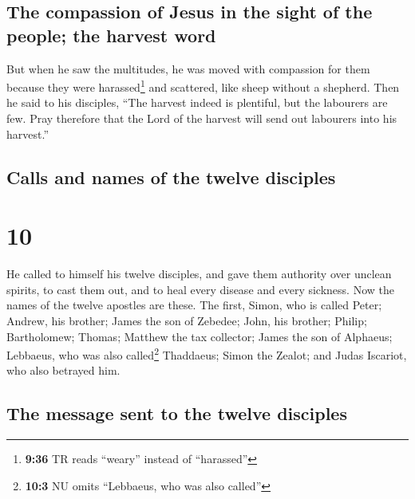 \hypertarget{the-compassion-of-jesus-in-the-sight-of-the-people-the-harvest-word}{%
\subsection{The compassion of Jesus in the sight of the people; the
harvest
word}\label{the-compassion-of-jesus-in-the-sight-of-the-people-the-harvest-word}}

 But when he saw the multitudes, he was moved with
compassion for them because they were harassed\footnote{\textbf{9:36} TR
  reads ``weary'' instead of ``harassed''} and scattered, like sheep
without a shepherd.  Then he said to his disciples, ``The
harvest indeed is plentiful, but the labourers are few. 
Pray therefore that the Lord of the harvest will send out labourers into
his harvest.''

\hypertarget{calls-and-names-of-the-twelve-disciples}{%
\subsection{Calls and names of the twelve
disciples}\label{calls-and-names-of-the-twelve-disciples}}

\hypertarget{section-9}{%
\section{10}\label{section-9}}

 He called to himself his twelve disciples, and gave them
authority over unclean spirits, to cast them out, and to heal every
disease and every sickness.  Now the names of the twelve
apostles are these. The first, Simon, who is called Peter; Andrew, his
brother; James the son of Zebedee; John, his brother; 
Philip; Bartholomew; Thomas; Matthew the tax collector; James the son of
Alphaeus; Lebbaeus, who was also called\footnote{\textbf{10:3} NU omits
  ``Lebbaeus, who was also called''} Thaddaeus;  Simon the
Zealot; and Judas Iscariot, who also betrayed him.

\hypertarget{the-message-sent-to-the-twelve-disciples}{%
\subsection{The message sent to the twelve
disciples}\label{the-message-sent-to-the-twelve-disciples}}


